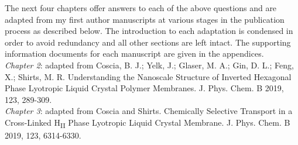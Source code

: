   The next four chapters offer answers to each of the above questions and are adapted from 
  my first author manuscripts at various stages in the publication process as described
  below. The introduction to each adaptation is condensed in order to avoid redundancy and 
  all other sections are left intact. The supporting information documents for each manuscript are
  given in the appendices. \\
  

%
%    
%    
  
  \noindent\textit{Chapter 2}: adapted from Coscia, B. J.; Yelk, J.; Glaser, M. A.; Gin, D. L.; Feng, X.; Shirts,
  M. R. Understanding the Nanoscale Structure of Inverted Hexagonal Phase Lyotropic Liquid Crystal Polymer
  Membranes. J. Phys. Chem. B 2019, 123, 289-309. \\
    
  \noindent\textit{Chapter 3}: adapted from Coscia and Shirts. Chemically Selective Transport in a Cross-Linked 
  H\textsubscript{II} Phase Lyotropic Liquid Crystal Membrane. J. Phys. Chem. B 2019, 123, 6314-6330. \\
    
